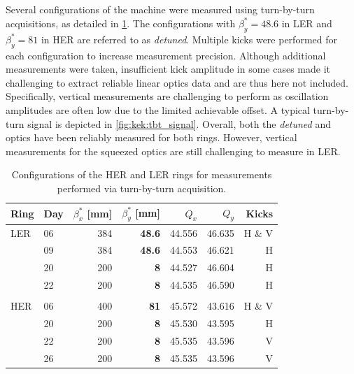 \subsection{}

Several configurations of the machine were measured using turn-by-turn acquisitions, as detailed in
\cref{tab:superkekb:configurations}. The configurations with $\beta_y^* = 48.6$ in LER and
$\beta_y^* = 81$ in HER are referred to as \textit{detuned}. Multiple kicks were performed for each
configuration to increase measurement precision. Although additional measurements were taken,
insufficient kick amplitude in some cases made it challenging to extract reliable linear optics
data and are thus here not included. Specifically, vertical measurements are challenging to perform
as oscillation amplitudes are often low due to the limited achievable offset.
A typical turn-by-turn signal is depicted in \cref{fig:kek:tbt_signal}.
Overall, both the \textit{detuned} and  optics have been reliably measured for
both rings. However, vertical measurements for the squeezed optics are still challenging to measure 
in LER.

\begin{table}
    \centering
    \begin{tabular}{llrrrrr}
    \hline
    Ring & Day & $\beta_x^*$ [mm] & $\beta_y^*$ [mm] & $Q_x$ & $Q_y$ & Kicks\\
    \hline
    LER        & 06 & 384 &\textbf{48.6} & 44.556 & 46.635 & H \& V \\
               & 09 & 384 &\textbf{48.6} & 44.553 & 46.621 & H  \\
               \hdashline
               & 20 & 200 & \textbf{8}   & 44.527 & 46.604 & H \\
               & 22 & 200 & \textbf{8}   & 44.535 & 46.590 & H \\
               &&&&&& \\
    HER        & 06 & 400 & \textbf{81}  & 45.572 & 43.616 & H \& V\\
               \hdashline
               & 20 & 200 & \textbf{8} & 45.530 & 43.595 & H \\
               & 22 & 200 & \textbf{8} & 45.535 & 43.596 & V \\
               & 26 & 200 & \textbf{8} & 45.535 & 43.596 & V \\
    \bottomrule
    \end{tabular}
  \caption{Configurations of the HER and LER rings for measurements performed via turn-by-turn
  acquisition.}
  \label{tab:superkekb:configurations}
\end{table}


